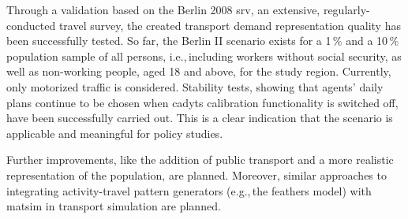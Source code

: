 Through a validation based on the Berlin 2008 \gls{srv}, an extensive, regularly-conducted travel survey, the created transport demand representation quality has been successfully tested. So far, the Berlin II scenario exists for a 1\,\% and a 10\,\% population sample of all persons, i.e.,\,including workers without social security, as well as non-working people, aged 18 and above, for the study region. Currently, only motorized traffic is considered. Stability tests, showing that agents' daily plans continue to be chosen when \gls{cadyts} calibration functionality is switched off, have been successfully carried out. This is a clear indication that the scenario is applicable and meaningful for policy studies.

Further improvements, like the addition of public transport and a more realistic representation of the population, are planned. Moreover, similar approaches to integrating activity-travel pattern generators (e.g.,\,the \gls{feathers} model) with \gls{matsim} in transport simulation are planned.

%
%

